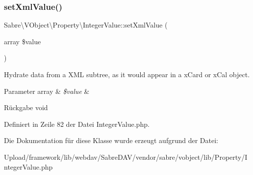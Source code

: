 \subsubsection{\texorpdfstring{set\+Xml\+Value()}{setXmlValue()}}
{\footnotesize\ttfamily Sabre\textbackslash{}\+V\+Object\textbackslash{}\+Property\textbackslash{}\+Integer\+Value\+::set\+Xml\+Value (\begin{DoxyParamCaption}\item[{array}]{\$value }\end{DoxyParamCaption})}

Hydrate data from a X\+ML subtree, as it would appear in a x\+Card or x\+Cal object.


\begin{DoxyParams}[1]{Parameter}
array & {\em \$value} & \\
\hline
\end{DoxyParams}
\begin{DoxyReturn}{Rückgabe}
void 
\end{DoxyReturn}


Definiert in Zeile 82 der Datei Integer\+Value.\+php.



Die Dokumentation für diese Klasse wurde erzeugt aufgrund der Datei\+:\begin{DoxyCompactItemize}
\item 
Upload/framework/lib/webdav/\+Sabre\+D\+A\+V/vendor/sabre/vobject/lib/\+Property/Integer\+Value.\+php\end{DoxyCompactItemize}
